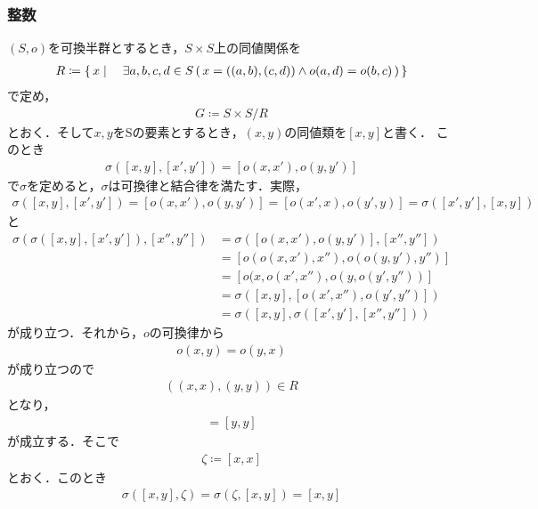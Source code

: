 \subsubsection{整数}
	$(S,o)$を可換半群とするとき，$S \times S$上の同値関係を
	\begin{align}
		R \coloneqq \left\{\, x \mid \quad \exists a,b,c,d \in S\, (\, x=((a,b),(c,d))
		\wedge o(a,d) = o(b,c)\, )\, \right\}
	\end{align}
	で定め，
	\begin{align}
		G \coloneqq S \times S / R
	\end{align}
	とおく．そして$x,y$をSの要素とするとき，$(x,y)$の同値類を$[x,y]$と書く．
	このとき
	\begin{align}
		\sigma \left([x,y],[x',y'] \right) = \left[o(x,x'),o(y,y')\right]
	\end{align}
	で$\sigma$を定めると，$\sigma$は可換律と結合律を満たす．実際，
	\begin{align}
		\sigma \left( [x,y],[x',y'] \right)
		= \left[ o(x,x'), o(y,y') \right]
		= \left[ o(x',x), o(y',y) \right]
		= \sigma \left( [x',y'],[x,y] \right)
	\end{align}
	と
	\begin{align}
		\sigma \left(\sigma \left([x,y],[x',y']\right),[x'',y''] \right)
		&= \sigma \left(\left[ o(x,x'),o(y,y') \right],[x'',y''] \right) \\
		&= \left[ o(o(x,x'),x''), o(o(y,y'),y'') \right] \\
		&= \left[ o(x,o(x',x''), o(y,o(y',y'')) \right] \\
		&= \sigma \left( [x,y], \left[ o(x',x''),o(y',y'') \right] \right) \\
		&= \sigma \left( [x,y], \sigma \left([x',y'],[x'',y'']\right) \right)
	\end{align}
	が成り立つ．それから，$o$の可換律から
	\begin{align}
		o(x,y) = o(y,x)
	\end{align}
	が成り立つので
	\begin{align}
		((x,x),(y,y)) \in R
	\end{align}
	となり，
	\begin{align}
		[x,x] = [y,y]
	\end{align}
	が成立する．そこで
	\begin{align}
		\zeta \coloneqq [x,x]
	\end{align}
	とおく．このとき
	\begin{align}
		\sigma \left( [x,y],\zeta \right)
		= \sigma \left( \zeta,[x,y] \right)
		= [x,y]
	\end{align}
